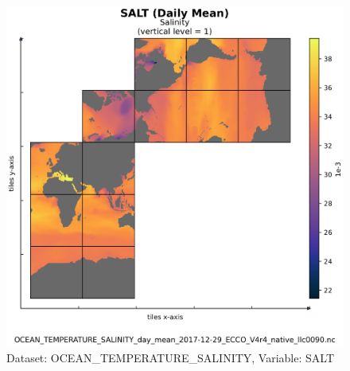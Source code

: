 \begin{figure}[H]
\centering
\includegraphics[scale=0.55]{../images/plots/native_plots/Ocean_Temperature_and_Salinity/SALT.png}
\caption{Dataset: OCEAN\_TEMPERATURE\_SALINITY, Variable: SALT}
\label{tab:table-OCEAN_TEMPERATURE_SALINITY_SALT-Plot}
\end{figure}
\newpage
\pagebreak
